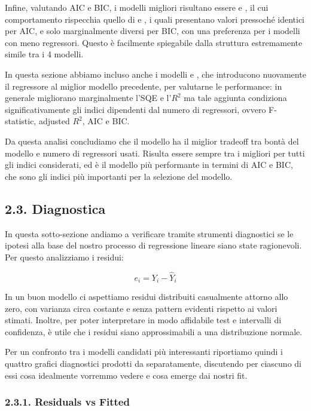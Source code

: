 Infine, valutando AIC e BIC, i modelli migliori risultano essere \texttt{} e \texttt{}, il cui comportamento rispecchia quello di \texttt{} e \texttt{}, i quali presentano valori pressoché identici per AIC, e solo marginalmente diversi per BIC, con una preferenza per i modelli con meno regressori. Questo è facilmente spiegabile dalla struttura estremamente simile tra i 4 modelli.

In questa sezione abbiamo incluso anche i modelli \texttt{} e \texttt{}, che introducono nuovamente il regressore \texttt{} al miglior modello precedente, per valutarne le performance: in generale migliorano marginalmente l'SQE e l'$R^2$ ma tale aggiunta condiziona significativamente gli indici dipendenti dal numero di regressori, ovvero F-statistic, adjusted $R^2$, AIC e BIC.

Da questa analisi concludiamo che il modello \texttt{} ha il miglior tradeoff tra bontà del modello e numero di regressori usati. Risulta essere sempre tra i migliori per tutti gli indici considerati, ed è il modello più performante in termini di AIC e BIC, che sono gli indici più importanti per la selezione del modello.

\subsection{2.3. Diagnostica}
\label{sec:23-diagnostica}

In questa sotto-sezione andiamo a verificare tramite strumenti diagnostici se le ipotesi alla base del nostro processo di regressione lineare siano state ragionevoli. Per questo analizziamo i residui:

\[
e_i = Y_i - \hat{Y}_i
\]

In un buon modello ci aspettiamo residui distribuiti casualmente attorno allo zero, con varianza circa costante e senza pattern evidenti rispetto ai valori stimati. Inoltre, per poter interpretare in modo affidabile test e intervalli di confidenza, è utile che i residui siano approssimabili a una distribuzione normale.

Per un confronto tra i modelli candidati più interessanti riportiamo quindi i quattro grafici diagnostici prodotti da \texttt{} separatamente, discutendo per ciascuno di essi cosa idealmente vorremmo vedere e cosa emerge dai nostri fit.

\subsubsection{2.3.1. Residuals vs Fitted}
\label{sec:231-residuals-vs-fitted}

